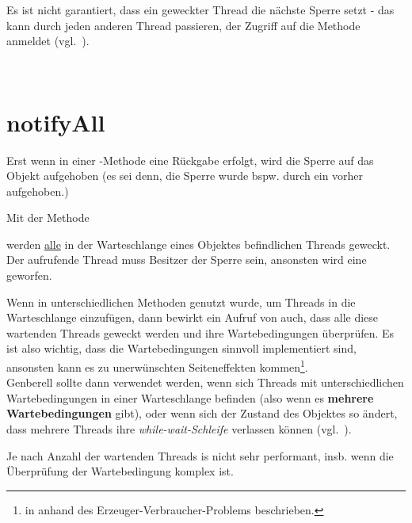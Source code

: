 \begin{tcolorbox}
    Es ist nicht garantiert, dass ein geweckter Thread die nächste Sperre setzt - das kann durch jeden anderen Thread passieren, der Zugriff auf die Methode anmeldet (vgl.~\cite[61]{Oec22}).
\end{tcolorbox}\\

\section{notifyAll}

Erst wenn in einer -Methode eine Rückgabe erfolgt, wird die Sperre auf das Objekt aufgehoben (es sei denn, die Sperre wurde bspw. durch ein  vorher aufgehoben.)

\noindent
Mit der Methode

\begin{center}
\end{center}

\noindent
werden \ul{alle} in der Warteschlange eines Objektes befindlichen Threads geweckt.
\noindent
Der aufrufende Thread muss Besitzer der Sperre sein, ansonsten wird eine  geworfen.\\

\begin{tcolorbox}
Wenn in unterschiedlichen Methoden  genutzt wurde, um Threads in die Warteschlange einzufügen, dann bewirkt ein Aufruf von  auch, dass alle diese wartenden Threads geweckt werden und ihre Wartebedingungen überprüfen.
Es ist also wichtig, dass die Wartebedingungen sinnvoll implementiert sind, ansonsten kann es zu unerwünschten Seiteneffekten kommen\footnote {
    in \cite[71 ff.]{Oec22} anhand des Erzeuger-Verbraucher-Problems beschrieben.
}.\\
Genberell sollte  dann verwendet werden, wenn sich Threads mit unterschiedlichen Wartebedingungen in einer Warteschlange befinden (also wenn es \textbf{mehrere Wartebedingungen} gibt), oder wenn sich der Zustand des Objektes so ändert, dass mehrere Threads ihre \textit{while-wait-Schleife} verlassen können (vgl.~\cite[73]{Oec22}).
\end{tcolorbox}


\noindent
Je nach Anzahl der wartenden Threads is  nicht sehr performant, insb. wenn die Überprüfung der Wartebedingung komplex ist.

